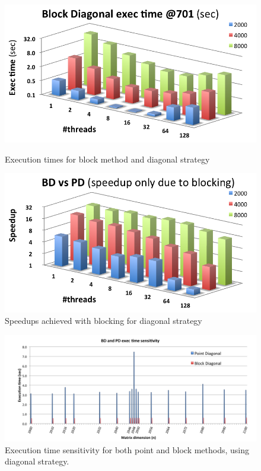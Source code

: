 \documentclass[../thesis]{subfiles}
\begin{document}
	\begin{figure}[p]
		\begin{minipage}[t]{0.47\textwidth}
			\centering
			\includegraphics[width=\textwidth]{assets/images/multicore/block-diagonal.png}
			\caption{Execution times for block method and diagonal strategy}
			\label{fig:multicore:block:diagonal:times}
		\end{minipage}
		\hfill
		\begin{minipage}[t]{0.48\textwidth}
			\centering
			\includegraphics[width=\textwidth]{assets/images/multicore/blocking-speedup.png}
			\caption{Speedups achieved with blocking for diagonal strategy}
			\label{fig:multicore:blocking:speedup}
		\end{minipage}
	\end{figure}

	\begin{figure}[p]
		\centering
		\includegraphics[height=0.28\textheight]{assets/images/multicore/resonance.png}
		\captionsetup{font=small}
		\caption{Execution time sensitivity for both point and block methods, using diagonal strategy.}
		\label{fig:multicore:sensitivity}
	\end{figure}
\end{document}
